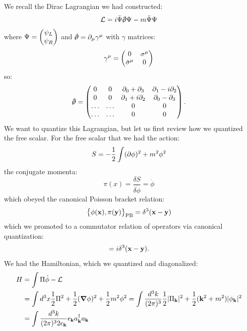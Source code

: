 We recall the Dirac Lagrangian we had constructed:
\begin{equation}
    \mathcal{L} = i\bar{\Psi}\slashed{\p}\Psi - m \bar{\Psi}\Psi
\end{equation}
where $\Psi = \begin{pmatrix}\psi_L \\ \psi_R\end{pmatrix}$ and $\slashed{\p} = \p_\mu \gamma^\mu$ with $\gamma$ matrices:
\begin{equation}
    \gamma^\mu = \begin{pmatrix}0 & \sigma^\mu \\ \bar{\sigma}^\mu & 0\end{pmatrix}
\end{equation}
so:
\begin{equation}
    \slashed{\p} = \m{0 & 0 & \p_0 + \p_3 & \p_1 - i\p_2 \\ 0 & 0 & \p_1 + i\p_2 & \p_0 - \p_3 \\ \ldots & \ldots & 0 & 0 \\ \ldots & \ldots & 0 & 0}.
\end{equation}
We want to quantize this Lagrangian, but let us first review how we quantized the free scalar. For the free scalar that we had the action:
\begin{equation}
    S = -\frac{1}{2}\int (\partial\phi)^2 + m^2\phi^2
\end{equation}
the conjugate momenta:
\begin{equation}
    \pi(x) = \frac{\delta S}{\delta \dot{\phi}} = \dot{\phi}
\end{equation}
which obeyed the canonical Poisson bracket relation:
\begin{equation}
    \set{\phi(\ensuremath{\mathbf{x}}), \pi(\ensuremath{\mathbf{y}})}_{\text{PB}} = \delta^3(\mathbf{x} - \mathbf{y})
\end{equation}
which we promoted to a commutator relation of operators via canonical quantization:
\begin{equation}
    [\hat{\phi}(\v{x}), \hat{\Pi}(\v{y})] = i\delta^3(\v{x} - \v{y}).
\end{equation}
We had the Hamiltonian, which we quantized and diagonalized:
\begin{equation}
    \begin{split}
        H &= \int \Pi \dot{\phi} - \mathcal{L} 
        \\ &= \int d^3x \frac{1}{2}\Pi^2 + \frac{1}{2}(\nabla \phi)^2 + \frac{1}{2}m^2\phi^2 = \int \frac{d^3k}{(2\pi)^3}\frac{1}{2}\abs{\Pi_\v{k}}^2 + \frac{1}{2}(\v{k}^2 + m^2)\abs{\phi_\v{k}}^2 
        \\ &= \int \frac{d^3k}{(2\pi)^32\e_\v{k}}\e_{\v{k}}a^\dag_{\v{k}}a_{\v{k}}
    \end{split}
\end{equation}
